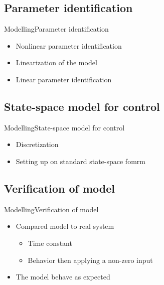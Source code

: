 

\subsection{Parameter identification}

\begin{frame}{Modelling}{Parameter identification}
\begin{itemize}
	\item<1-> Nonlinear parameter identification
	\item<1-> Linearization of the model 
	\item<1-> Linear parameter identification
\end{itemize}
\end{frame}

\subsection{State-space model for control}

\begin{frame}{Modelling}{State-space model for control}
\begin{itemize}
	\item<1-> Discretization 
	\item<1-> Setting up on standard state-space fomrm
\end{itemize}
\end{frame}

\subsection{Verification of model}

\begin{frame}{Modelling}{Verification of model}
\begin{itemize}
	\item<1-> Compared model to real system
	\begin{itemize}
		\item<1-> Time constant 
		\item<1-> Behavior then applying a non-zero input
	\end{itemize}
\end{itemize}
\begin{itemize}
	\item<1-> The model behave as expected
\end{itemize}

\begin{figure}[H]
   \centering
    
\end{figure}

\end{frame}




